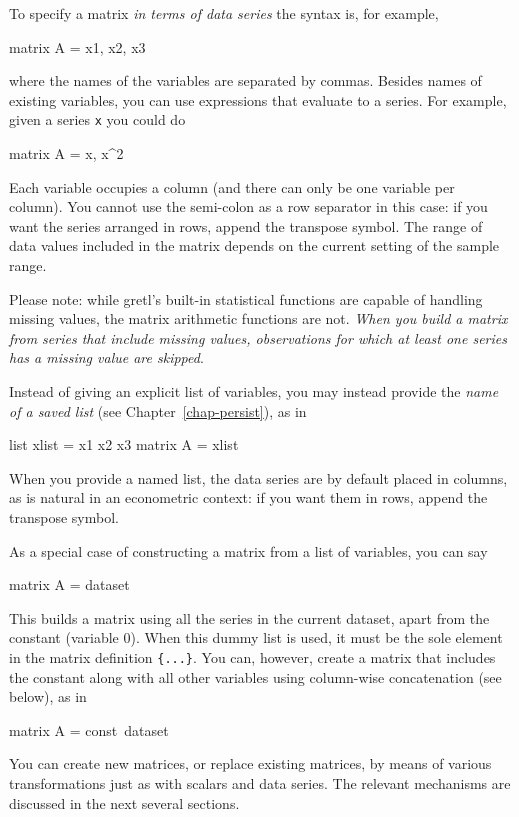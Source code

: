 To specify a matrix \textit{in terms of data series} the syntax is,
for example,
%
\begin{code}
matrix A = { x1, x2, x3 }
\end{code}
%
where the names of the variables are separated by commas.  Besides
names of existing variables, you can use expressions that evaluate to
a series.  For example, given a series \texttt{x} you could do
%
\begin{code}
matrix A = { x, x^2 }
\end{code}
%
Each variable occupies a column (and there can only be one variable
per column).  You cannot use the semi-colon as a row separator in this
case: if you want the series arranged in rows, append the transpose
symbol.  The range of data values included in the matrix depends on
the current setting of the sample range.

Please note: while gretl's built-in statistical functions are
capable of handling missing values, the matrix arithmetic functions
are not.  \emph{When you build a matrix from series that include missing
values, observations for which at least one series has a missing value
are skipped}.  

Instead of giving an explicit list of variables, you may instead
provide the \textit{name of a saved list} (see
Chapter~\ref{chap-persist}), as in
%
\begin{code}
list xlist = x1 x2 x3
matrix A = { xlist }
\end{code}
%
When you provide a named list, the data series are by default placed
in columns, as is natural in an econometric context: if you want them
in rows, append the transpose symbol.

As a special case of constructing a matrix from a list of variables,
you can say
%
\begin{code}
matrix A = { dataset }
\end{code}
%
This builds a matrix using all the series in the current dataset,
apart from the constant (variable 0).  When this dummy list is used, it
must be the sole element in the matrix definition \texttt{\{...\}}.  You
can, however, create a matrix that includes the constant along with
all other variables using column-wise concatenation (see below), as in
%
\begin{code}
matrix A = {const}~{dataset}
\end{code}
%

You can create new matrices, or replace existing matrices, by means of
various transformations just as with scalars and data series.  The
relevant mechanisms are discussed in the next several sections.

